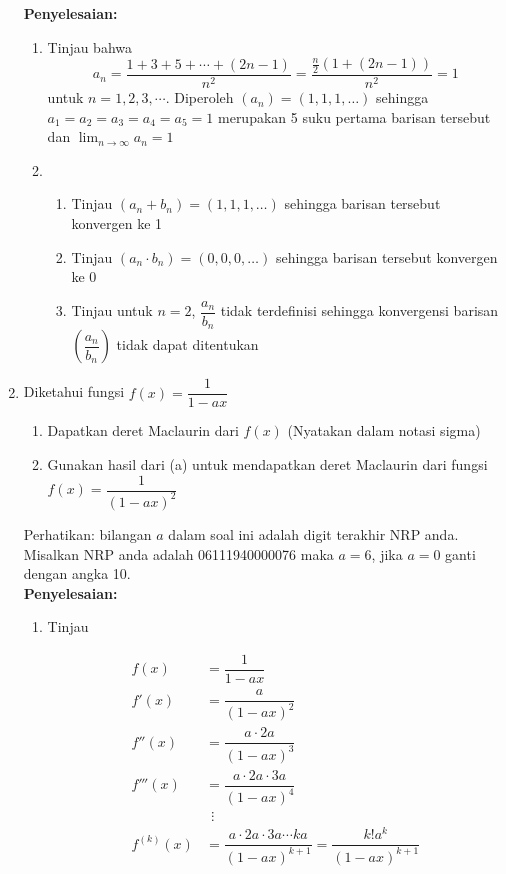 \documentclass{article}
\begin{document}
\begin{enumerate}
\begin{enumerate}
	\end{enumerate}
	\textbf{Penyelesaian:}
	\begin{enumerate}
		\item Tinjau bahwa 
		$$ a_n = \dfrac{1+3+5+\cdots +(2n-1)}{n^2} =\dfrac{\frac{n}{2}(1+(2n-1))}{n^2}=1$$
		untuk $n=1,2,3,\cdots$. Diperoleh $(a_n)=(1,1,1,\dots)$ sehingga $a_1=a_2=a_3=a_4=a_5=1$ merupakan 5 suku pertama barisan tersebut dan $\displaystyle \lim_{n\rightarrow \infty} a_n=1$ 
		\item \begin{enumerate}
		\item Tinjau $(a_n+b_n)=(1,1,1,\dots)$ sehingga barisan tersebut konvergen ke 1
		\item Tinjau $(a_n\cdot b_n)=(0,0,0,\dots)$ sehingga barisan tersebut konvergen ke 0
		\item Tinjau untuk $n=2$, $\dfrac{a_n}{b_n}$ tidak terdefinisi sehingga konvergensi barisan $\left(\dfrac{a_n}{b_n}\right)$ tidak dapat ditentukan
		\end{enumerate}
	\end{enumerate}
	\item Diketahui fungsi $f(x)=\dfrac{1}{1-ax}$
	\begin{enumerate}
		\item Dapatkan deret Maclaurin dari $f(x)$ (Nyatakan dalam notasi sigma)
		\item Gunakan hasil dari (a) untuk mendapatkan deret Maclaurin dari fungsi $f(x)=\dfrac{1}{(1-ax)^2}$
	\end{enumerate}
	Perhatikan: bilangan $a$ dalam soal ini adalah digit terakhir NRP anda. Misalkan NRP anda adalah 06111940000076 maka $a=6$, jika $a=0$ ganti dengan angka 10.\\
	\textbf{Penyelesaian:}
	\begin{enumerate}
		\item Tinjau 
		\begin{multicols}{2}
		\begin{align*}
		f(x) &= \dfrac{1}{1-ax}\\
		f'(x) &= \dfrac{a}{(1-ax)^2}\\
		f''(x) &= \dfrac{a\cdot 2a}{(1-ax)^3}\\
		f'''(x) &= \dfrac{a\cdot 2a\cdot 3a}{(1-ax)^4}\\
		&~~\vdots\\
		f^{(k)}(x) &= \dfrac{a\cdot 2a\cdot 3a\cdots ka}{(1-ax)^{k+1}} = \dfrac{k!a^k}{(1-ax)^{k+1}}
		\end{align*}
		\begin{align*}

\end{align*}
\end{multicols}
\end{enumerate}
\end{enumerate}
\end{document}
